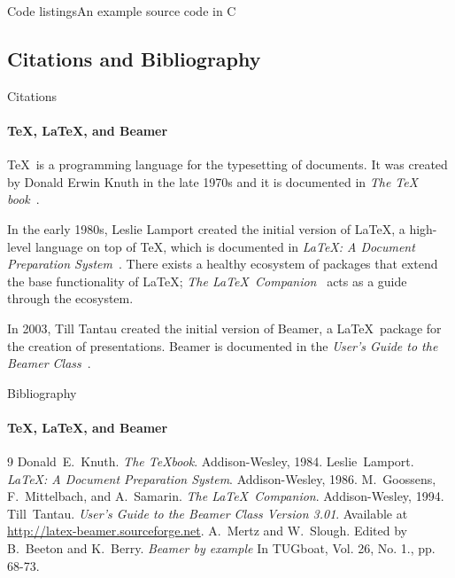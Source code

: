 \documentclass{beamer}
\begin{document}
    \begin{frame}{Code listings}{An example source code in C}
      \sleepSort
    \end{frame}

    \subsection{Citations and Bibliography}
    \begin{frame}[label=citations]{Citations}
      \framesubtitle{\TeX, \LaTeX, and Beamer}

      \justifying\TeX\ is a programming language for the typesetting
      of documents. It was created by Donald Erwin Knuth in the late
      1970s and it is documented in \emph{The \TeX
      book}~\cite{knuth84}.

      In the early 1980s, Leslie Lamport created the initial version
      of \LaTeX, a high-level language on top of \TeX, which is
      documented in \emph{\LaTeX : A Document Preparation
      System}~\cite{lamport94}. There exists a healthy ecosystem of
      packages that extend the base functionality of \LaTeX;
      \emph{The \LaTeX\ Companion}~\cite{MG94} acts as a guide
      through the ecosystem.

      In 2003, Till Tantau created the initial version of Beamer, a
      \LaTeX\ package for the creation of presentations. Beamer is
      documented in the \emph{User's Guide to the Beamer
      Class}~\cite{tantau04}.
    \end{frame}

    \begin{frame}[label=bibliography]{Bibliography}
      \framesubtitle{\TeX, \LaTeX, and Beamer}
      \begin{thebibliography}{9}
            Donald~E.~Knuth.
            \emph{The \TeX book}.
            Addison-Wesley, 1984.
            Leslie~Lamport.
            \emph{\LaTeX : A Document Preparation System}.
            Addison-Wesley, 1986.
            M.~Goossens, F.~Mittelbach, and A.~Samarin.
            \emph{The \LaTeX\ Companion}.
            Addison-Wesley, 1994.
            Till~Tantau.
            \emph{User's Guide to the Beamer Class Version 3.01}.
            Available at \url{http://latex-beamer.sourceforge.net}.
            A.~Mertz and W.~Slough.
            Edited by B.~Beeton and K.~Berry.
            \emph{Beamer by example} In TUGboat,
              Vol. 26, No. 1., pp. 68-73.
      \end{thebibliography}
    \end{frame}
\end{document}
